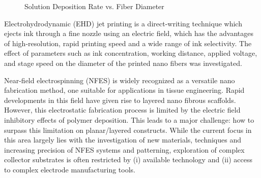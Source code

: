 \documentclass[5p,,preprint,12pt,twocolumn]{elsarticle}
\makeatletter
\def\fixFloatSize#1{}%
\makeatother
\begin{document}
\bgroup
\fixFloatSize{images/085b1fe7-0896-4800-b231-bf68cf86983b-uplt_solutiondepositionrate_vs_fiberdiameter.png}
\begin{figure}[!htbp]
\centering \makeatletter{}
\makeatother 
\caption{{Solution Deposition Rate vs. Fiber Diameter}}
\label{f-08e527ddef81}
\end{figure}
\egroup
Electrohydrodynamic (EHD) jet printing is a direct-writing technique which ejects ink through a fine nozzle using an electric field, which has the advantages of high-resolution, rapid printing speed and a wide range of ink selectivity. The effect of parameters such as ink concentration, working distance, applied voltage, and stage speed on the diameter of the printed nano fibers was investigated.

Near-field electrospinning (NFES) is widely recognized as a versatile nano fabrication method, one suitable for applications in tissue engineering. Rapid developments in this field have given rise to layered nano fibrous scaffolds. However, this electrostatic fabrication process is limited by the electric field inhibitory effects of polymer deposition. This leads to a major challenge: how to surpass this limitation on planar/layered constructs. While the current focus in this area largely lies with the investigation of new materials, techniques and increasing precision of NFES systems and patterning, exploration of complex collector substrates is often restricted by (i) available technology and (ii) access to complex electrode manufacturing tools.
\end{document}
